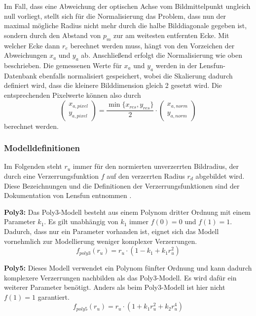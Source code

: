 Im Fall, dass eine Abweichung der optischen Achse vom Bildmittelpunkt ungleich null vorliegt, stellt sich für die Normalisierung das Problem, dass nun der maximal mögliche Radius nicht mehr durch die halbe Bilddiagonale gegeben ist, sondern durch den Abstand von $p_m$ zur am weitesten entfernten Ecke. Mit welcher Ecke dann $r_e$ berechnet werden muss, hängt von den Vorzeichen der Abweichungen $x_{a}$ und $y_{a}$ ab. Anschließend erfolgt die Normalisierung wie oben beschrieben. Die gemessenen Werte für $x_{a}$ und $y_{a}$ werden in der Lensfun-Datenbank ebenfalls normalisiert gespeichert, wobei die Skalierung dadurch definiert wird, dass die kleinere Bilddimension gleich 2 gesetzt wird. Die entsprechenden Pixelwerte können also durch
\begin{equation}
\begin{pmatrix}
x_{a,pixel} \\ y_{a,pixel}
\end{pmatrix}
 = \frac{\min\{x_{res}, y_{res}\}}{2} \cdot
 \begin{pmatrix}
 x_{a,norm} \\ y_{a,norm}
 \end{pmatrix}
\end{equation} 
berechnet werden.


\newpage
\subsubsection{Modelldefinitionen}\label{sec:Modeldefinitions}
\label{subsubsec:modeldef}

Im Folgenden steht $r_u$ immer für den normierten unverzerrten Bildradius, der durch eine Verzerrungsfunktion $f$ auf den verzerrten Radius $r_d$ abgebildet wird. Diese Bezeichnungen und die Definitionen der Verzerrungsfunktionen sind der Dokumentation von Lensfun entnommen \cite{lensfun}.

\textbf{Poly3:} Das Poly3-Modell besteht aus einem Polynom dritter Ordnung mit einem Parameter $k_1$. Es gilt unabhängig von $k_1$ immer $f(0) = 0$ und $f(1) = 1$. Dadurch, dass nur ein Parameter vorhanden ist, eignet sich das Modell vornehmlich zur Modellierung weniger komplexer Verzerrungen.
\begin{equation}
	f_{poly3}(r_u) = r_u \cdot (1 - k_1 + k_1 r_u^2)
\end{equation}

\textbf{Poly5:} Dieses Modell verwendet ein Polynom fünfter Ordnung und kann dadurch komplexere Verzerrungen nachbilden als das Poly3-Modell. Es wird dafür ein weiterer Parameter benötigt. Anders als beim Poly3-Modell ist hier nicht $f(1) = 1$ garantiert.
\begin{equation}
	f_{poly5}(r_u) = r_u \cdot (1 + k_1 r_u^2 + k_2 r_u^4)
\end{equation}

